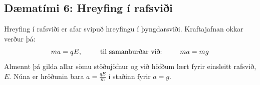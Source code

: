 \ifdefined \wholebook \else\documentclass[oneside]{book}\usepackage{EdlBook}\graphicspath{{figures/}}
\begin{document}
\newpage

\subsection*{Dæmatími 6: Hreyfing í rafsviði}

\begin{tcolorbox}
Hreyfing í rafsviði er afar svipuð hreyfingu í þyngdarsviði. Kraftajafnan okkar verður þá:
\begin{align*}
    ma = qE, \hspace{0.9cm} \text{til samanburðar við:} \hspace{0.9cm} ma = mg
\end{align*}
Almennt þá gilda allar sömu stöðujöfnur og við höfðum lært fyrir einsleitt rafsvið, $E$. Núna er hröðunin bara $a = \frac{qE}{m}$ í staðinn fyrir $a = g$.
\end{tcolorbox}
\end{document}
